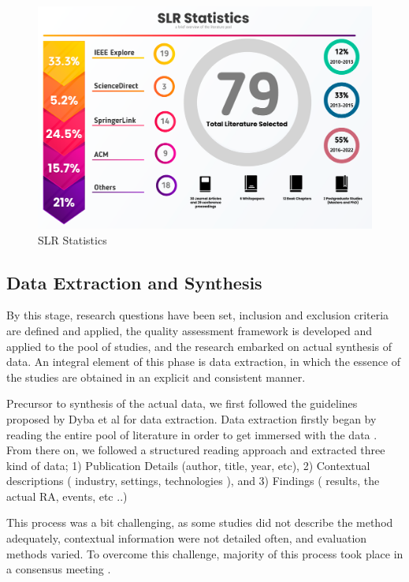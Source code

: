 \documentclass{ieeeaccess}
\begin{document}
\begin{figure}[t]
    \includegraphics[width=18cm]{Media/databases-statitistic-[Recovered].png}
    \caption{SLR Statistics}
    \label{fig:SLRStats}
\end{figure}

\subsection{Data Extraction and Synthesis}

By this stage, research questions have been set, inclusion and exclusion criteria are defined and applied, the quality assessment framework is developed and applied to the pool of studies, and the research embarked on actual synthesis of data. An integral element of this phase is data extraction, in which the essence of the studies are obtained in an explicit and consistent manner.

Precursor to synthesis of the actual data, we first followed the guidelines proposed by Dyba et al \cite{cruzes2011recommended} for data extraction. Data extraction firstly began by reading the entire pool of literature in order to get immersed with the data \cite{braun2006using}. From there on, we followed a structured reading approach and extracted three kind of data; 1) Publication Details (author, title, year, etc), 2) Contextual descriptions ( industry, settings, technologies ), and 3) Findings ( results, the actual RA, events, etc ..)

This process was a bit challenging, as some studies did not describe the method adequately, contextual information were not detailed often, and evaluation methods varied. To overcome this challenge, majority of this process took place in a consensus meeting \cite{dyba2007applying}.
\end{document}
